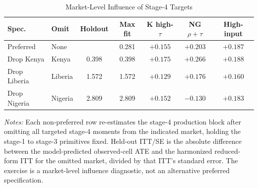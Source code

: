 \begin{table}[H]
\centering
\caption{Market-Level Influence of Stage-4 Targets}
\label{tab:struct_market_influence}
\begin{threeparttable}
\scriptsize
\begin{tabular}[t]{@{}llccccc@{}}
\toprule
Spec. & Omit & Holdout & Max fit & K high-$\tau$ & NG $\rho+\tau$ & High-input \\
\midrule
Preferred & None &  & 0.281 & $+0.155$ & $+0.203$ & $+0.187$ \\
Drop Kenya & Kenya & 0.398 & 0.398 & $+0.175$ & $+0.266$ & $+0.188$ \\
Drop Liberia & Liberia & 1.572 & 1.572 & $+0.129$ & $+0.176$ & $+0.160$ \\
Drop Nigeria & Nigeria & 2.809 & 2.809 & $+0.152$ & $-0.130$ & $+0.183$ \\
\bottomrule
\end{tabular}
\begin{tablenotes}
\footnotesize
\item \textit{Notes:} Each non-preferred row re-estimates the stage-4 production block after omitting all targeted stage-4 moments from the indicated market, holding the stage-1 to stage-3 primitives fixed. Held-out ITT/SE is the absolute difference between the model-predicted observed-cell ATE and the harmonized reduced-form ITT for the omitted market, divided by that ITT's standard error. The exercise is a market-level influence diagnostic, not an alternative preferred specification.
\end{tablenotes}
\end{threeparttable}
\end{table}
